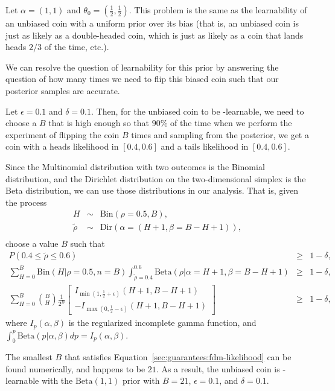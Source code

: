 \begin{example}

Let $\alpha=(1, 1)$ and $\theta_0=(\frac 1 2, \frac 1 2)$. This problem is the same as the learnability of an unbiased coin with a uniform prior over its bias (that is, an unbiased coin is just as likely as a double-headed coin, which is just as likely as a coin that lands heads $2/3$ of the time, etc.).

We can resolve the question of learnability for this prior by answering the question of how many times we need to flip this biased coin such that our posterior samples are accurate.

Let $\epsilon = 0.1$ and $\delta = 0.1$. Then, for the unbiased coin to be \bed-learnable, we need to choose a $B$ that is high enough so that $90\%$ of the time when we perform the experiment of flipping the coin $B$ times and sampling from the posterior, we get a coin with a heads likelihood in $[0.4,0.6]$ and a tails likelihood in $[0.4,0.6]$.

Since the Multinomial distribution with two outcomes is the Binomial distribution, and the Dirichlet distribution on the two-dimensional simplex is the Beta distribution, we can use those distributions in our analysis. That is, given the process
\begin{eqnarray}
H &\sim& \mbox{Bin}(\rho=0.5, B),\\
\tilde \rho &\sim& \mbox{Dir}(\alpha=(H+1, \beta=B-H+1)),\\
\end{eqnarray}
choose a value $B$ such that
\begin{eqnarray}
P(0.4\leq \tilde \rho\leq 0.6)&\geq& 1-\delta,\\
%
\sum_{H=0}^B \mbox{Bin}(H|\rho=0.5,n=B) \int_{\tilde \rho=0.4}^{0.6} \mbox{Beta}(\rho|\alpha=H+1,\beta=B-H+1)&\geq& 1-\delta,\\
%
\label{sec:guarantees:fdm-likelihood}
\sum_{H=0}^B {B \choose H} \frac 1 {2^B}
\left[
 \begin{array}{l}
  I_{\min({1,{\frac 1 2 + \epsilon}})}(H+1,B-H+1)\\
  -I_{\max({0,{\frac 1 2 - \epsilon}})}(H+1,B-H+1)
 \end{array}
\right]&\geq& 1-\delta,
\end{eqnarray}
where $I_p(\alpha,\beta)$ is the regularized incomplete gamma function, and $\int_0^p\mbox{Beta}(p|\alpha,\beta) dp = I_p(\alpha,\beta)$. 

The smallest $B$ that satisfies Equation~\ref{sec:guarantees:fdm-likelihood} can be found numerically, and happens to be $21$. As a result, the unbiased coin is \bed-learnable with the $\mbox{Beta}(1,1)$ prior with $B=21$, $\epsilon=0.1$, and $\delta=0.1$.

\end{example}


